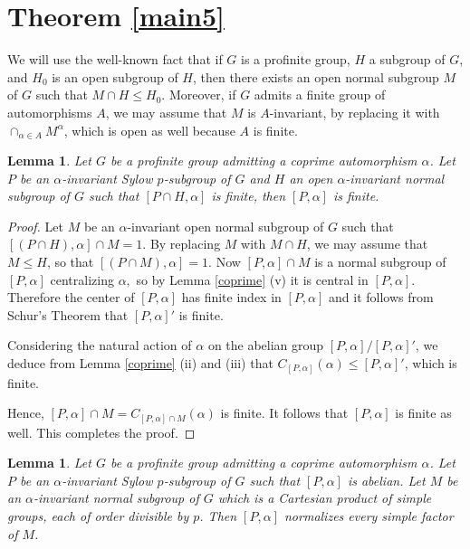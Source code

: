 \documentclass[12pt]{amsart}
\newtheorem{lemma}[theorem]{\bf Lemma}
\newcommand{\al }{\alpha }
\begin{document}
\section{Theorem \ref{main5}}\label{last} 

We will use the well-known fact that if $G$ is a profinite group,  $H$ a  subgroup of $G$, and $H_0$ is an open subgroup of $H$, then there exists an open normal subgroup $M$ of $G$ such that $M\cap H\le H_0.$ Moreover, if $G$ admits a finite group of automorphisms $A$, we may assume that $M$ is $A$-invariant, by replacing it with $\cap_{\alpha\in A}M^{\alpha}$, which is open as well because $A$ is finite. 

\begin{lemma}\label{open} Let $G$ be a profinite group admitting a coprime automorphism $\alpha$. 
Let $P$ be an $\alpha$-invariant Sylow $p$-subgroup of $G$ and $H$  an open $\al$-invariant normal subgroup of $G$ such that $[P\cap H,\al] $ is finite, then  $[P,\alpha]$ is finite. 
\end{lemma} 
\begin{proof}
 Let $M$ be an $\alpha$-invariant open normal subgroup of $G$ such that $[(P\cap H),\alpha]\cap M=1$. By replacing $M$ with $M\cap H$, we may assume that $M\le H$, so that $[(P\cap M),\alpha]=1$.  Now $[P,\alpha]\cap M$ is a normal subgroup of $[P,\alpha]$ centralizing $\alpha,$ so by Lemma \ref{coprime} (v) it is central in $[P,\alpha].$
Therefore the center of $[P,\alpha]$ has finite index in $[P,\alpha]$ and it follows from  Schur's Theorem \cite[4.12]{Rob} that $[P,\alpha]'$ is finite.

Considering the natural action of $\alpha$ on the abelian group $[P,\alpha]/[P,\alpha]'$, we deduce from Lemma \ref{coprime} (ii) and (iii) that $C_{[P,\alpha]}(\alpha)\le [P,\alpha]'$, which is finite. 

Hence, $[P,\alpha]\cap M=C_{[P,\alpha]\cap M}(\alpha)$ is finite. It follows that  $[P,\alpha]$  is finite as well. This completes the proof.
\end{proof}


\begin{lemma}\label{KpP} Let $G$ be a profinite group admitting a coprime automorphism $\alpha$. Let $P$ be an $\alpha$-invariant Sylow $p$-subgroup of $G$ such that $[P,\alpha]$ is abelian. Let $M$ be an $\alpha$-invariant normal subgroup of $G$ which is a Cartesian product of simple groups, each of order divisible by $p$. Then $[P,\alpha]$ normalizes every simple factor of $M$.
\end{lemma}
\end{document}
